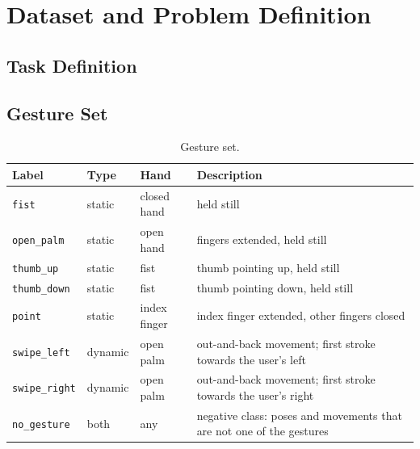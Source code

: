 \section{Dataset and Problem Definition}


\subsection{Task Definition}

\subsection{Gesture Set}
\begin{table}[h]
\centering
\begin{tabular}{@{}lll p{6.2cm}@{}}
\toprule
Label & Type & Hand & Description \\
\midrule
\texttt{fist}        & static  & closed hand & held still \\
\texttt{open\_palm}  & static  & open hand & fingers extended, held still \\
\texttt{thumb\_up}   & static  & fist & thumb pointing up, held still \\
\texttt{thumb\_down} & static  & fist & thumb pointing down, held still \\
\texttt{point}       & static  & index finger & index finger extended, other fingers closed \\
\texttt{swipe\_left}  & dynamic & open palm & out-and-back movement; first stroke towards the user's left \\
\texttt{swipe\_right} & dynamic & open palm & out-and-back movement; first stroke towards the user's right \\
\texttt{no\_gesture}  & both    & any & negative class: poses and movements that are not one of the gestures \\
\bottomrule
\end{tabular}
\caption{Gesture set. }
\label{tab:gestures}
\end{table}

